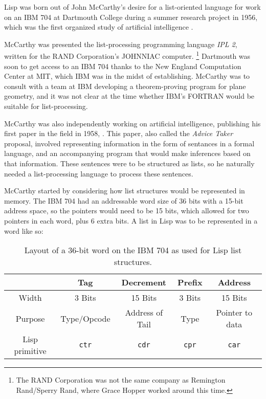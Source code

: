 Lisp was born out of John McCarthy's desire for a list-oriented language
for work on an IBM 704 at Dartmouth College during a summer research project
in 1956, which was the first organized study of artificial intelligence
\cite{mccarthy_history_of_lisp_1978}.

McCarthy was presented the list-processing programming language \textit{IPL 2},
written for the RAND Corporation's JOHNNIAC computer.
\footnote{The RAND Corporation was not the same company as Remington Rand/Sperry Rand, where Grace Hopper worked around this time.}
Dartmouth was soon to get access to an IBM 704 thanks to the New England Computation Center
at MIT, which IBM was in the midst of establishing.
McCarthy was to consult with a team at IBM developing a theorem-proving program for plane geometry,
and it was not clear at the time whether IBM's FORTRAN would be suitable for list-processing.

McCarthy was also independently working on artificial intelligence,
publishing his first paper in the field in 1958,
.
This paper, also called the \textit{Advice Taker} proposal,
involved representing information in the form of sentances in a formal language,
and an accompanying program that would make inferences based on that information.
These sentences were to be structured as lists, so he naturally
needed a list-processing language to process these sentences.

McCarthy started by considering how list structures would be represented in
memory. The IBM 704 had an addressable word size of 36 bits with
a 15-bit address space, so the pointers would need to be 15 bits,
which allowed for two pointers in each word, plus 6 extra bits.
A list in Lisp was to be represented in a word like so:

\begin{table}[h]
	\centering
	\begin{tabular}{|c|c|c|c|c|}
		\hline
		               & \textbf{Tag} & \textbf{Decrement} & \textbf{Prefix} & \textbf{Address} \\
		\hline
		Width          & 3 Bits       & 15 Bits            & 3 Bits          & 15 Bits          \\
		\hline
		Purpose        & Type/Opcode  & Address of Tail    & Type            & Pointer to data  \\
		\hline
		Lisp primitive & \texttt{ctr} & \texttt{cdr}       & \texttt{cpr}    & \texttt{car}     \\
		\hline
	\end{tabular}
	\caption{Layout of a 36-bit word on the IBM 704 as used for Lisp list structures.}
\end{table}

